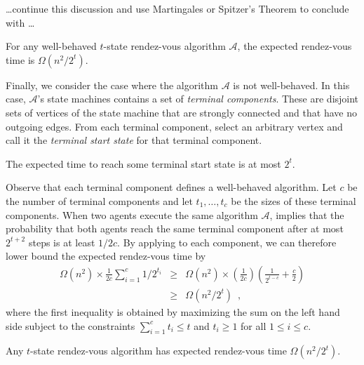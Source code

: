 \documentclass[lotsofwhite]{patmorin}
\begin{document}
\ldots continue this discussion and use Martingales or Spitzer's Theorem to 
conclude with \ldots

\begin{lem}
For any well-behaved $t$-state rendez-vous algorithm $\mathcal{A}$, the expected rendez-vous time is $\Omega(n^2/2^t)$.
\end{lem}

Finally, we consider the case where the algorithm $\mathcal{A}$ is not
well-behaved.  In this case, $\mathcal{A}$'s state machines contains a set
of \emph{terminal components}.  These are disjoint sets of vertices of the
state machine that are strongly connected and that have no outgoing edges.
From each terminal component, select an arbitrary vertex and call it
the \emph{terminal start state} for that terminal component.

\begin{lem}
The expected time to reach some terminal start state is at most $2^t$.
\end{lem}

Observe that each terminal component defines a well-behaved algorithm.
Let $c$ be the number of terminal components and let $t_1,\ldots,t_c$ be
the sizes of these terminal components.  When two agents execute the same
algorithm $\mathcal{A}$,  implies that the probability
that both agents reach the same terminal component after at most $2^{t+2}$
steps is at least $1/2c$.  By applying  to each component, we can therefore lower bound the expected rendez-vous time by
\begin{eqnarray*}
  \Omega(n^2)\times \frac{1}{2c}\sum_{i=1}^c 1/2^{t_i} 
    & \ge & \Omega(n^2)\times \left(\frac{1}{2c}\right)\left(\frac{1}{2^{t-c}}+\frac{c}{2}\right) \\
    & \ge & \Omega(n^2/2^t) \enspace ,
\end{eqnarray*}
where the first inequality is obtained by maximizing the sum on the
left hand side subject to the constraints $\sum_{i=1}^c t_i \le t$
and $t_i \ge 1$ for all $1\le i\le c$.

\begin{thm}
Any $t$-state rendez-vous algorithm has expected rendez-vous time $\Omega(n^2/2^t)$.
\end{thm}
\end{document}
